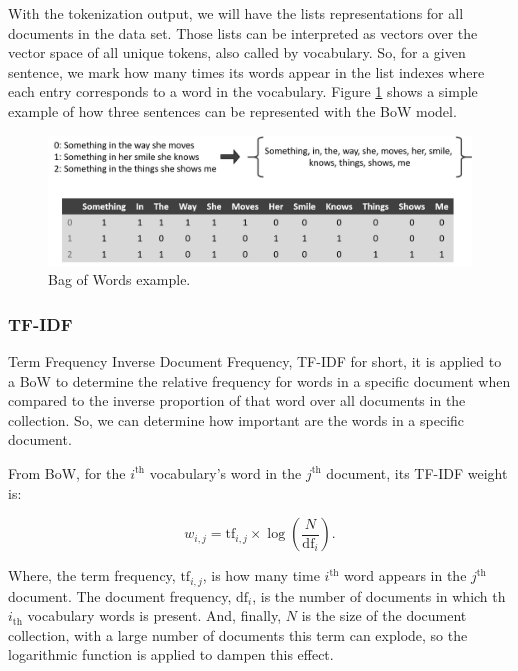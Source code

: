 	With the tokenization output, we will have the lists representations for all documents in the data set. Those lists can be interpreted as vectors over the vector space of all unique tokens, also called by vocabulary. So, for a given sentence, we mark how many times its words appear in the list indexes where each entry corresponds to a word in the vocabulary. Figure \ref{fig:bag-of-words} shows a simple example of how three sentences can be represented with the BoW model.
	
	\begin{figure}[h!]
		\centering
		\includegraphics[width=\linewidth]{01.Chapters/02.Background/bag-of-words}
		\caption{Bag of Words example.}
		\label{fig:bag-of-words}
	\end{figure}
	
	\subsubsection{TF-IDF}
	
	Term Frequency Inverse Document Frequency, TF-IDF for short, it is applied to a BoW to determine the relative frequency for words in a specific document when compared to the inverse proportion of that word over all documents in the collection. So, we can determine how important are the words in a specific document. 
	
	From BoW, for the $i^{\text{th}}$ vocabulary's word in the $j^{\text{th}}$ document, its TF-IDF weight is:
	
	\begin{equation}
	\label{eq:tf-idf}
	w_{i, j} = \text{tf}_{i, j} \times \log\left(\dfrac{N}{\text{df}_{i}}\right) \text{.}
	\end{equation}
	
	Where, the term frequency, $\text{tf}_{i, j}$, is how many time $i^{\text{th}}$ word appears in the $j^{\text{th}}$ document. The document frequency, $\text{df}_{i}$, is the number of documents in which th $i_{\text{th}}$ vocabulary words is present. And, finally, $N$ is the size of the document collection, with a large number of documents this term can explode, so the logarithmic function is applied to dampen this effect.
	
